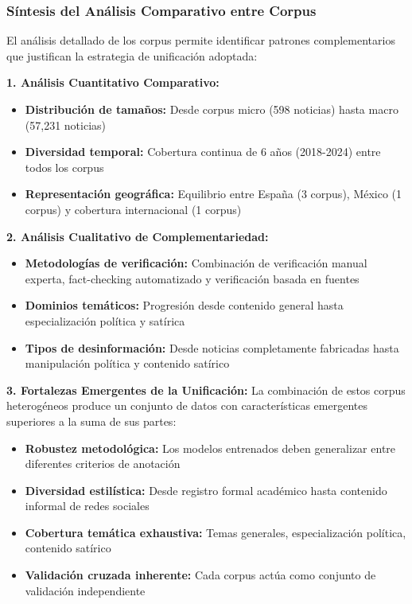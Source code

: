 \subsubsection{Síntesis del Análisis Comparativo entre Corpus}

El análisis detallado de los corpus permite identificar patrones complementarios que justifican la estrategia de unificación adoptada:

\textbf{1. Análisis Cuantitativo Comparativo:}
\begin{itemize}
    \item \textbf{Distribución de tamaños:} Desde corpus micro (598 noticias) hasta macro (57,231 noticias)
    \item \textbf{Diversidad temporal:} Cobertura continua de 6 años (2018-2024) entre todos los corpus
    \item \textbf{Representación geográfica:} Equilibrio entre España (3 corpus), México (1 corpus) y cobertura internacional (1 corpus)
\end{itemize}

\textbf{2. Análisis Cualitativo de Complementariedad:}
\begin{itemize}
    \item \textbf{Metodologías de verificación:} Combinación de verificación manual experta, fact-checking automatizado y verificación basada en fuentes
    \item \textbf{Dominios temáticos:} Progresión desde contenido general hasta especialización política y satírica
    \item \textbf{Tipos de desinformación:} Desde noticias completamente fabricadas hasta manipulación política y contenido satírico
\end{itemize}

\textbf{3. Fortalezas Emergentes de la Unificación:}
La combinación de estos corpus heterogéneos produce un conjunto de datos con características emergentes superiores a la suma de sus partes:
\begin{itemize}
    \item \textbf{Robustez metodológica:} Los modelos entrenados deben generalizar entre diferentes criterios de anotación
    \item \textbf{Diversidad estilística:} Desde registro formal académico hasta contenido informal de redes sociales
    \item \textbf{Cobertura temática exhaustiva:} Temas generales, especialización política, contenido satírico
    \item \textbf{Validación cruzada inherente:} Cada corpus actúa como conjunto de validación independiente
\end{itemize}

